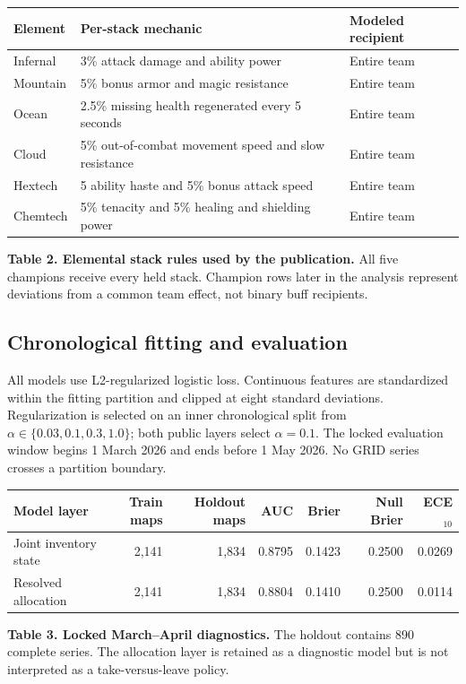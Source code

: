 \documentclass[10pt,letterpaper]{article}
\newcommand{\fineprint}[1]{{\footnotesize\color{muted}#1}}
\begin{document}
\begin{center}
\small
\begin{tabularx}{\linewidth}{@{}lYl@{}}
\toprule
\textbf{Element} & \textbf{Per-stack mechanic} & \textbf{Modeled recipient} \\
\midrule
Infernal & 3\% attack damage and ability power & Entire team \\
Mountain & 5\% bonus armor and magic resistance & Entire team \\
Ocean & 2.5\% missing health regenerated every 5 seconds & Entire team \\
Cloud & 5\% out-of-combat movement speed and slow resistance & Entire team \\
Hextech & 5 ability haste and 5\% bonus attack speed & Entire team \\
Chemtech & 5\% tenacity and 5\% healing and shielding power & Entire team \\
\bottomrule
\end{tabularx}
\vspace{0.20em}

\fineprint{\textbf{Table 2. Elemental stack rules used by the publication.} All five champions receive every held stack. Champion rows later in the analysis represent deviations from a common team effect, not binary buff recipients.}
\end{center}

\subsection{Chronological fitting and evaluation}
All models use L2-regularized logistic loss. Continuous features are standardized within the fitting partition and clipped at eight standard deviations. Regularization is selected on an inner chronological split from $\alpha\in\{0.03,0.1,0.3,1.0\}$; both public layers select $\alpha=0.1$. The locked evaluation window begins 1 March 2026 and ends before 1 May 2026. No GRID series crosses a partition boundary.

\begin{center}
\small
\begin{tabular}{@{}lrrrrrr@{}}
\toprule
\textbf{Model layer} & \textbf{Train maps} & \textbf{Holdout maps} & \textbf{AUC} & \textbf{Brier} & \textbf{Null Brier} & \textbf{ECE$_{10}$} \\
\midrule
Joint inventory state & 2,141 & 1,834 & 0.8795 & 0.1423 & 0.2500 & 0.0269 \\
Resolved allocation & 2,141 & 1,834 & 0.8804 & 0.1410 & 0.2500 & 0.0114 \\
\bottomrule
\end{tabular}
\vspace{0.20em}

\fineprint{\textbf{Table 3. Locked March--April diagnostics.} The holdout contains 890 complete series. The allocation layer is retained as a diagnostic model but is not interpreted as a take-versus-leave policy.}
\end{center}
\end{document}
